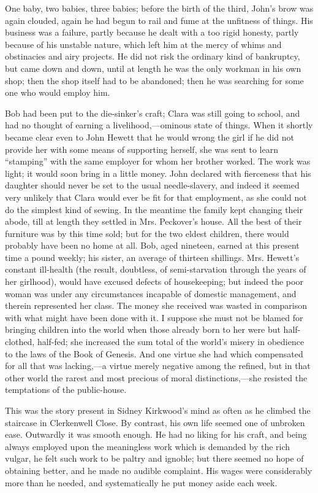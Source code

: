 One baby, two babies, three babies; before the birth of the third,
John's brow was again clouded, again he had begun to rail and fume at
the unfitness of things. His business was a failure, partly because he
dealt with a too rigid honesty, partly because of his unstable nature,
which left him at the mercy of whims and obstinacies and airy projects.
He did not risk the ordinary kind of bankruptcy, but came down and down,
until at length he was the only workman in his own shop; then the shop
itself had to be abandoned; then he was searching for some one who would
employ him.

Bob had been put to the die-sinker's craft; Clara was still going to
school, and had no thought of earning a livelihood,---ominous
{\protect\hypertarget{135}{}{}}state of things. When it shortly became
clear even to John Hewett that he would wrong the girl if he did not
provide her with some means of supporting herself, she was sent to learn
``stamping'' with the same employer for whom her brother worked. The
work was light; it would soon bring in a little money. John declared
with fierceness that his daughter should never be set to the usual
needle-slavery, and indeed it seemed very unlikely that Clara would ever
be fit for that employment, as she could not do the simplest kind of
sewing. In the meantime the family kept changing their abode, till at
length they settled in Mrs. Peckover's house. All the best of their
furniture was by this time sold; but for the two eldest children, there
would probably have been no home at all. Bob, aged nineteen, earned at
this present time a pound weekly; his sister, an average of thirteen
shillings. Mrs. Hewett's constant ill-health (the result, doubtless, of
semi-starvation through the years of her girlhood), would have excused
defects of housekeeping; but {\protect\hypertarget{136}{}{}}indeed the
poor woman was under any circumstances incapable of domestic management,
and therein represented her class. The money she received was wasted in
comparison with what might have been done with it. I suppose she must
not be blamed for bringing children into the world when those already
born to her were but half-clothed, half-fed; she increased the sum total
of the world's misery in obedience to the laws of the Book of Genesis.
And one virtue she had which compensated for all that was lacking,---a
virtue merely negative among the refined, but in that other world the
rarest and most precious of moral distinctions,---she resisted the
temptations of the public-house.

This was the story present in Sidney Kirkwood's mind as often as he
climbed the staircase in Clerkenwell Close. By contrast, his own life
seemed one of unbroken ease. Outwardly it was smooth enough. He had no
liking for his craft, and being always employed upon the meaningless
work which is demanded {\protect\hypertarget{137}{}{}}by the rich
vulgar, he felt such work to be paltry and ignoble; but there seemed no
hope of obtaining better, and he made no audible complaint. His wages
were considerably more than he needed, and systematically he put money
aside each week.

